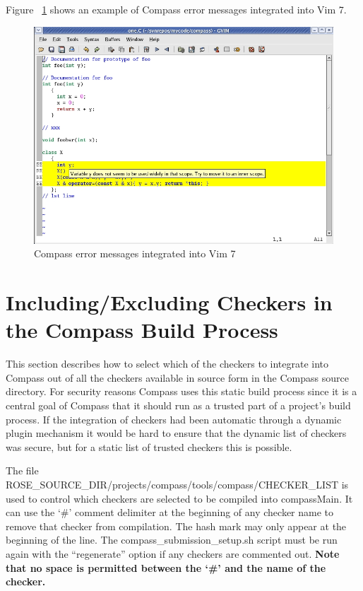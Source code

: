 Figure ~\ref{Compass_VIM7_Screenshot} shows an example of Compass error
messages integrated into Vim 7.
\begin{figure}[!htp]
\hspace{-0.7in}
\includegraphics[width=7in]{compass_vim7.jpg}
\caption{Compass error messages integrated into Vim 7}
\label{Compass_VIM7_Screenshot}
\end{figure}


\section{Including/Excluding Checkers in the Compass Build Process}
\label{CompassBuildProcess}

   This section describes how to select which of the checkers to integrate 
into Compass out of all the checkers available in source form in the Compass 
source directory. For security reasons Compass uses this static build process 
since it is a central goal of Compass that it should run as a trusted part of 
a project's build process. If the integration of checkers had been automatic 
through a dynamic plugin mechanism it would be hard to ensure that the dynamic 
list of checkers was secure, but for a static list of trusted checkers this is 
possible.

The file ROSE\_SOURCE\_DIR/projects/compass/tools/compass/CHECKER\_LIST is used to control which checkers are selected to
be compiled into compassMain. It can use the `\#' comment delimiter at the beginning of
any checker name to remove that checker from compilation. The hash mark may
only appear at the beginning of the line. The compass\_submission\_setup.sh
script must be run again with the ``regenerate'' option if any checkers are
commented out. 
{\bf Note that no space is permitted between the `\#' and the name
of the checker.}


